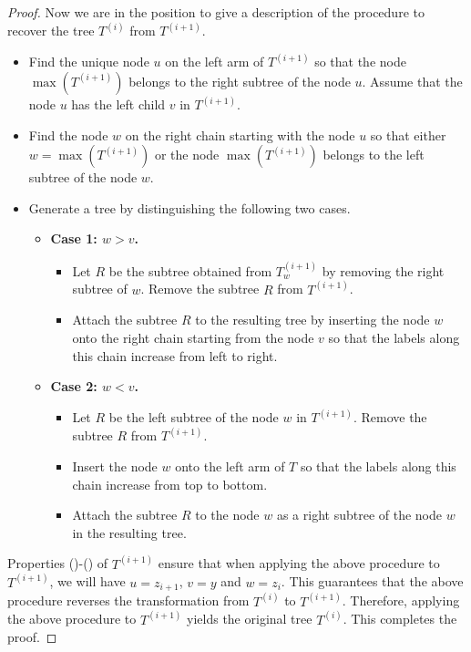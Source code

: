 \documentclass[12pt]{article}
\numberwithin{equation}{section}
\theoremstyle{plain}
\newcommand{\rmnum}[1]{\romannumeral #1}
\begin{document}
\begin{proof}
   	 		Now we are in the position to give a description of the procedure to recover the
   	 		tree $T^{(i)}$ from $T^{(i+1)}$.  
   	 		
   	 		\begin{itemize}
   	 			\item Find the unique node $u$ on the left arm of $T^{(i+1)}$ so that the node $\max(T^{(i+1)})$ belongs to the right subtree of the node $u$.   Assume that the node $u$ has the left child $v$ in $T^{(i+1)}$.
   	 			\item Find the node $w$ on the right chain starting with the node $u$ so that  either $w=\max(T^{(i+1)})$ or the node $\max(T^{(i+1)})$ belongs to the left subtree of the node $w$.  
   	 			\item Generate a tree by distinguishing the following two cases.
   	 			\begin{itemize}
   	 				\item {\bf Case 1: $w>v$. } 
   	 				\begin{itemize}
   	 					\item Let $R$ be the subtree obtained from $T^{(i+1)}_{w}$ by removing the  right subtree of $w$.
   	 		 Remove the subtree $R$ from $T^{(i+1)}$.
   	 					\item Attach the subtree $R$ to the resulting tree by  inserting the node $w$ onto the right chain starting from the node $v$ so that the labels along this chain increase from left to right.
   	 				\end{itemize}
   	 				
   	 				\item {\bf Case 2: $w<v$.}
   	 				\begin{itemize}
   	 					\item Let $R$ be the  left subtree of the node $w$ in $T^{(i+1)}$.
   	 				 Remove the subtree $R$ from $T^{(i+1)}$.
   	 					\item  Insert the node $w$ onto the left arm of $T$ so that the labels along this chain increase  from top to bottom.
   	 					\item Attach   the subtree $R$ to the node $w$ as a right subtree of the node $w$ in the resulting tree. 
   	 				\end{itemize}
   	 				
   	 			\end{itemize}
   	 		\end{itemize}
   	 		Properties (\rmnum{1})-(\rmnum{4}) of $T^{(i+1)}$ ensure that when applying the above procedure to $T^{(i+1)}$,  we will have $u=z_{i+1}$, $v=y$ and $w=z_i$.   This guarantees that the above procedure reverses the transformation from $T^{(i)}$ to $T^{(i+1)}$. Therefore, applying the above procedure to $T^{(i+1)}$ yields the original tree $T^{(i)}$. This completes the proof.  
   	 		\end{proof}
   	 	
\end{document}
